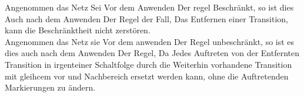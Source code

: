 Angenommen das Netz Sei Vor dem Anwenden Der regel Beschränkt, so ist dies Auch nach dem Anwenden Der Regel der Fall, Das Entfernen einer Transition, kann die Beschränktheit nicht zerstören.\\
Angenommen das Netz sie Vor dem anwenden Der Regel unbeschränkt, so ist es dies auch nach dem Anwenden Der Regel, Da Jedes Auftreten von der Entfernten Transition in irgenteiner Schaltfolge durch die Weiterhin vorhandene Transition mit gleihcem vor und Nachbereich ersetzt werden kann, ohne die Auftretenden Markierungen zu ändern.
